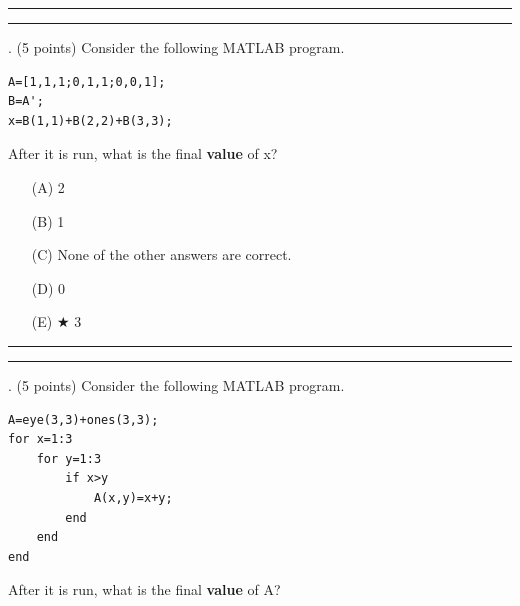 \documentclass{article}
\begin{document}
\vspace*{2em}
\hrule
\vspace{2em}

\vspace{2em}
\hrule height 2pt


\newpage
{}. (5 points)
Consider the following MATLAB program.
\begin{verbatim}
A=[1,1,1;0,1,1;0,0,1];
B=A';
x=B(1,1)+B(2,2)+B(3,3);
\end{verbatim}
After it is run, what is the final \textbf{value} of x?


\begin{enumerate}
\item[(A)]
2

\item[(B)]
1

\item[(C)]
None of the other answers are correct.

\item[(D)]
0

\item[(E)] $\bigstar$ 
3

\end{enumerate}

\vspace*{2em}
\hrule
\vspace{2em}

\vspace{2em}
\hrule height 2pt


\newpage
{}. (5 points)
Consider the following MATLAB program.
\begin{verbatim}
A=eye(3,3)+ones(3,3);
for x=1:3
    for y=1:3
        if x>y
            A(x,y)=x+y;
        end
    end
end
\end{verbatim}
After it is run, what is the final \textbf{value} of A?
\end{document}
